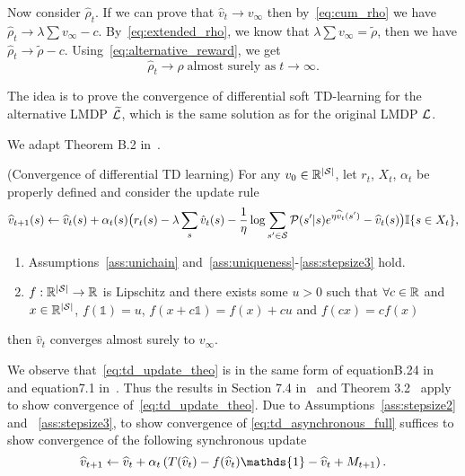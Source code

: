 Now consider $\hat\rho_t$. If we can prove that $\hat v_t\rightarrow v_\infty$ then by~\eqref{eq:cum_rho} we have $\hat\rho_t\rightarrow\lambda\sum v_\infty - c$. By~\eqref{eq:extended_rho}, we know that $\lambda\sum v_\infty = \widetilde\rho$, then we have $\hat\rho_t\rightarrow\widetilde\rho-c$. Using~\eqref{eq:alternative_reward}, we get 
\begin{equation*}
    \hat\rho_t\rightarrow\rho\;\text{almost surely as}\;t\rightarrow\infty.
\end{equation*}

The idea is to prove the convergence of differential soft TD-learning for the alternative LMDP $\widetilde{\mathcal{L}}$, which is the same solution as for the original LMDP $\mathcal{L}$.

We adapt Theorem B.2 in~\cite{Wan2021}.

\begin{theorem} (Convergence of differential TD learning)
    For any $v_0\in\mathbb{R}^{\lvert\mathcal{S}\rvert}$, let $r_t$, $X_t$, $\alpha_t$ be properly defined and consider the update rule
    \begin{equation}
        \widehat{v}_{t+1}(s) \gets \widehat{v}_t(s) + \alpha_t(s) \big( r_t(s) - \lambda\sum_s \hat v_t(s) - \frac 1 \eta \log \sum_{s'\in\mathcal{S}} \mathcal{P}(s'|s) e^{\eta \widehat{v}_t(s')} - \widehat{v}_t(s)\big)  \mathbb{I}\{s\in X_t\},
        \label{eq:td_update_theo}
    \end{equation}
    
    \begin{enumerate}
        \item Assumptions~\ref{ass:unichain} and~\ref{ass:uniqueness}-\ref{ass:stepsize3} hold.
        \item $f:\mathbb{R}^{\lvert\mathcal{S}\rvert}\rightarrow\mathbb{R}$ is Lipschitz and there exists some $u>0$ such that $\forall c\in\mathbb{R}$ and $x\in\mathbb{R}^{\lvert\mathcal{S}\rvert}$, $f(\mathds{1})=u$, $f(x + c\mathds{1})=f(x)+cu$ and $f(cx) = c f(x)$
    \end{enumerate}
    then $\hat v_t$ converges almost surely to $v_\infty$.
    \label{theo:our_theorem}
\end{theorem}

We observe that~\eqref{eq:td_update_theo} is in the same form of equationB.24 in~\cite{Wan2021} and equation7.1 in~\cite{Borkar2009}. Thus the results in Section 7.4 in~\cite{Borkar2009} and Theorem 3.2~\cite{Borkar1998} apply to show convergence of~\eqref{eq:td_update_theo}. Due to Assumptions~\ref{ass:stepsize2} and ~\ref{ass:stepsize3}, to show convergence of \eqref{eq:td_asynchronous_full} suffices to show convergence of the following synchronous update
\begin{equation}
    \widehat{v}_{t+1} \gets \widehat{v}_t + \alpha_t \pa{ T(\widehat{v}_t) - f(\widehat{v}_t) \mathds{1} - \widehat{v}_t + M_{t+1}}.
    \label{eq:synchronous}
\end{equation}


